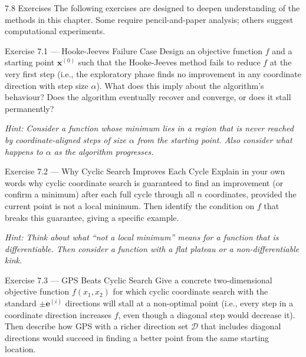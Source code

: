 \documentclass[aspectratio=169,10pt]{beamer}
\begin{document}
\begin{frame}[allowframebreaks]{7.8 Exercises}
  The following exercises are designed to deepen understanding of
  the methods in this chapter.  Some require pencil-and-paper analysis;
  others suggest computational experiments.

  \begin{exampleblock}{Exercise 7.1 --- Hooke-Jeeves Failure Case}
    Design an objective function $f$ and a starting point
    $\mathbf{x}^{(0)}$ such that the Hooke-Jeeves method fails to
    reduce $f$ at the very first step (i.e., the exploratory phase
    finds no improvement in any coordinate direction with step size
    $\alpha$).  What does this imply about the algorithm's behaviour?
    Does the algorithm eventually recover and converge, or does it
    stall permanently?

    \medskip
    \textit{Hint: Consider a function whose minimum lies in a region
    that is never reached by coordinate-aligned steps of size $\alpha$
    from the starting point.  Also consider what happens to $\alpha$
    as the algorithm progresses.}
  \end{exampleblock}

  \begin{exampleblock}{Exercise 7.2 --- Why Cyclic Search Improves Each Cycle}
    Explain in your own words why cyclic coordinate search is guaranteed
    to find an improvement (or confirm a minimum) after each full cycle
    through all $n$ coordinates, provided the current point is not a
    local minimum.  Then identify the condition on $f$ that breaks this
    guarantee, giving a specific example.

    \medskip
    \textit{Hint: Think about what ``not a local minimum'' means for a
    function that is differentiable.  Then consider a function with
    a flat plateau or a non-differentiable kink.}
  \end{exampleblock}

  \begin{exampleblock}{Exercise 7.3 --- GPS Beats Cyclic Search}
    Give a concrete two-dimensional objective function $f(x_1, x_2)$
    for which cyclic coordinate search with the standard $\pm\mathbf{e}^{(i)}$
    directions will stall at a non-optimal point (i.e., every step
    in a coordinate direction increases $f$, even though a diagonal
    step would decrease it).  Then describe how GPS with a richer
    direction set $\mathcal{D}$ that includes diagonal directions would
    succeed in finding a better point from the same starting location.
  \end{exampleblock}


\end{frame}
\end{document}
